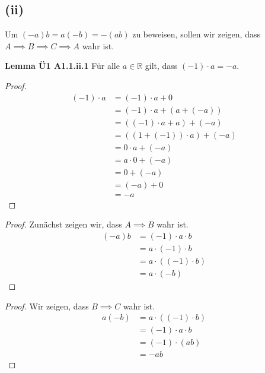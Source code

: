 \documentclass[12pt]{extarticle}
\begin{document}
\subsection*{(ii)}
Um \((-a)b=a(-b)=-(ab)\) zu beweisen, sollen wir zeigen, dass
\(A \implies B \implies C \implies A\) wahr ist.


\textbf{Lemma Ü1 A1.1.ii.1}  Für alle \(a \in \mathbb{R}\) gilt, dass $(-1)
\cdot a = -a$.
\begin{proof}
\begin{align*}
  (-1) \cdot a &= (-1) \cdot a + 0 \tag*{A3}\\
               &= (-1) \cdot a + (a + (-a)) \tag*{A4}\\
               &= ((-1) \cdot a + a) + (-a) \tag*{A1} \\
               &= ((1 + (-1)) \cdot a) + (-a) \tag*{D} \\
               &= 0 \cdot a + (-a) \tag*{A4} \\
               &= a \cdot 0 + (-a) \tag*{M2} \\
               &= 0 + (-a) \tag*{Skript Satz 1.5.1} \\
               &= (-a) + 0 \tag*{A2} \\
               &= -a \tag*{A3}
\end{align*}
\end{proof}

\begin{proof}
  Zunächst zeigen wir, dass \(A \implies B\) wahr ist.
\begin{align*}
  (-a)b &= (-1) \cdot a \cdot b \tag*{Lemma Ü1 A1.1.ii.1}\\
        &= a \cdot (-1) \cdot b \tag*{M2} \\
        &= a \cdot ((-1) \cdot b) \tag*{M1} \\
  &= a \cdot (-b) \tag*{Lemma Ü1 A1.1.ii.1}
\end{align*}
\end{proof}

\begin{proof}
Wir zeigen, dass \(B \implies C\) wahr ist.
\begin{align*}
  a(-b) &= a \cdot ((-1) \cdot b) \tag*{Lemma Ü1 A1.1.ii.1} \\
        &= (-1) \cdot a \cdot b \tag*{M2} \\
        &= (-1) \cdot (ab) \tag*{M1} \\
        &= -ab \tag*{Lemma Ü1 A1.1.ii.1}
\end{align*}
\end{proof}
\end{document}
